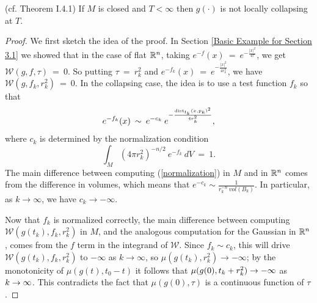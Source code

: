 \begin{theorem}
  \label{thm:kl-no-local-collapsing-theorem-i-noncollapsing-theorem}
 \label{noncollthm} (cf. Theorem I.4.1)
If $M$ is closed and $T < \infty$ then $g(\cdot)$ is not locally
collapsing at $T$.
\end{theorem}
\begin{proof}
We first sketch the idea of the proof.
In Section \ref{Basic Example for Section 3.1} we showed that in the
case of flat ${\mathbb R}^n$, taking $e^{-f}(x) \: = \:
e^{- \frac{|x|^2}{4\tau}}$, we get ${\mathcal W}(g, f, \tau) \: = \: 0$.
So putting $\tau \: = \: r_k^2$ and $e^{-f_k}(x) \: = \:
e^{- \frac{|x|^2}{4r_k^2}}$, we have ${\mathcal W}(g, f_k, r_k^2) \: = \: 0$.
In the collapsing case, the idea is to use a test function $f_k$ so that
\begin{equation}
e^{-f_k}(x) \: \sim \:
e^{- c_k} \: e^{- \frac{\operatorname{dist}_{t_k}(x, p_k)^2}{4r_k^2}},
\end{equation}
where $c_k$ is determined by the normalization condition
\begin{equation} \label{normalization}
\int_M (4 \pi r_k^2)^{- n/2} \: e^{-f_k} \: dV \: = \: 1.
\end{equation}
The main difference between computing (\ref{normalization}) in $M$ and
in ${\mathbb R}^n$ comes from the difference in volumes, which means that
$e^{-c_k} \sim \frac{1}{r_k^{-n} \: vol(B_k)}$.
In particular, as $k \rightarrow
\infty$, we have $c_k \rightarrow - \infty$.

Now that $f_k$ is normalized correctly, the main difference between
computing ${\mathcal W}(g(t_k), f_k, r_k^2)$ in $M$, and the
analogous computation for the
Gaussian in ${\mathbb R}^n$,
comes from the $f$ term in the integrand of ${\mathcal W}$.  Since
$f_k \sim c_k$, this will drive ${\mathcal W}(g(t_k), f_k, r_k^2)$ to
$- \infty$ as $k \rightarrow \infty$, so $\mu(g(t_k), r_k^2)
\rightarrow - \infty$; by the monotonicity of $\mu(g(t),t_0-t)$
it follows that $\mu(g(0),t_k+r_k^2)\rightarrow -\infty$ as $k\rightarrow \infty$.
This contradicts the fact that $\mu(g(0),\tau)$ is a continuous function
of $\tau$.


\end{proof}
